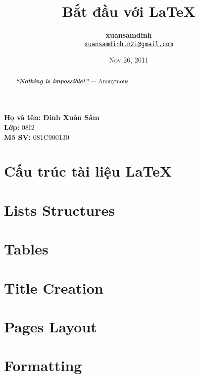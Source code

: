 \documentclass[11pt,a4paper]{article}
\title{\textbf{\huge{Bắt đầu với \LaTeX}}}
\author{\textbf{xuansamdinh}\\
\texttt{\underline{xuansamdinh.n2i@gmail.com}}}
\date{Nov 26, 2011}
\begin{document}
\maketitle
\begin{flushleft}
	\textbf{Họ và tên: Đinh Xuân Sâm}\\
	\textbf{Lớp:} 08I2\\
	\textbf{Mã SV:} 081C900130
\end{flushleft}
\pagebreak
\renewcommand{\abstractname}{--- Philosophy ---}
\begin{abstract}
\begin{center}
\textbf{\emph{``Nothing is impossible!''}} --- Anonymous
\end{center}
\end{abstract}
\pagebreak
\renewcommand{\contentsname}{\underline{NỘI DUNG}}
\tableofcontents
\listoftables
\pagebreak


\newpage
\part{Cấu trúc tài liệu \LaTeX{}}



\newpage


\part{Lists Structures}
%

\newpage

\part{Tables}


\newpage

\part{Title Creation}


\newpage

\part{Pages Layout}


\newpage

\part{Formatting}
%

\newpage
{}

\nocite{*}
%

\end{document}
